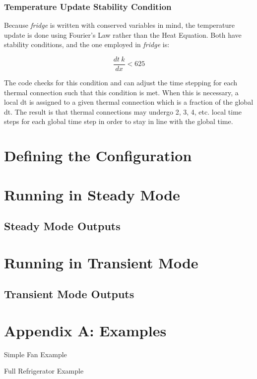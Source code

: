 \documentclass[12pt]{report}
\begin{document}
\subsection{Temperature Update Stability Condition}
Because \emph{fridge} is written with conserved variables in mind, the temperature update 
is done using Fourier's Law rather than the Heat Equation.  Both have stability 
conditions, and the one employed in \emph{fridge} is:

\begin{equation}
   \frac{dt\:k}{dx} < 625
\end{equation}

The code checks for this condition and can adjust the time stepping for each 
thermal connection such that this condition is met.  When this is necessary, 
a local dt is assigned to a given thermal connection which is a fraction of 
the global dt.  The result is that thermal connections may undergo 2, 3, 4, etc. 
local time steps for each global time step in order to stay in line with the 
global time.

\chapter{Defining the Configuration}





\chapter{Running in Steady Mode}


\section{Steady Mode Outputs}

\chapter{Running in Transient Mode}


\section{Transient Mode Outputs}

\chapter{Appendix A:  Examples}

Simple Fan Example

Full Refrigerator Example
\end{document}
